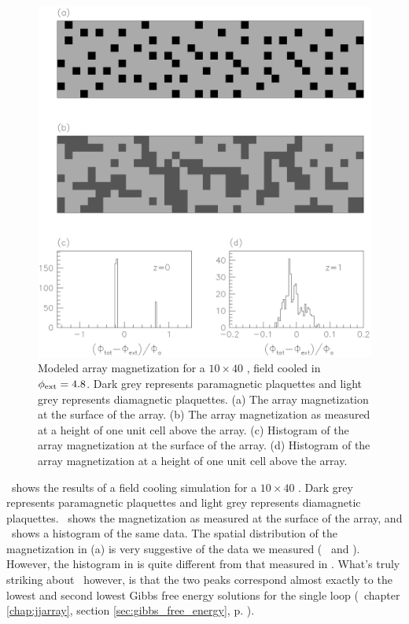 \begin{figure}[p]
\includegraphics[width=5.7in]{figs/pme_theory/fig46.eps}
\caption[Modeled array magnetization for a $10\times 40$ \jja,
field cooled in $\phiext = 4.8$.]
{Modeled array magnetization for a $10\times 40$ \jja, field
cooled in $\phiext = 4.8$. 
Dark grey represents paramagnetic plaquettes and light grey represents
diamagnetic plaquettes.
(a) The array magnetization at the surface of the array. 
(b) The array magnetization as measured at a height of one
unit cell above the array. 
(c) Histogram of the array magnetization at the surface of the
array.
(d) Histogram of the array magnetization at a height of one
unit cell above the array. }
\label{fig:model_array_mag}
\end{figure}

\ shows the results of a field
cooling simulation for a $10 \times 40 $ \jja. Dark grey represents
paramagnetic plaquettes and light grey represents diamagnetic 
plaquettes. \ shows the 
magnetization as measured at the surface of the array, and
\ shows a histogram of the
same data. The spatial distribution of the magnetization in (a)
is very suggestive of the data we measured (\cf\ 
 and ). 
However, the histogram in 
 is quite different from that
measured in \FigRef{fig:paramag_image_b}. What's truly
striking about  \ however, is that
the two peaks correspond almost exactly to the lowest and second
lowest Gibbs free energy solutions for the single loop
(\cf\ chapter \ref{chap:jjarray}, section \ref{sec:gibbs_free_energy},
p. \pageref{sec:gibbs_free_energy}). 

